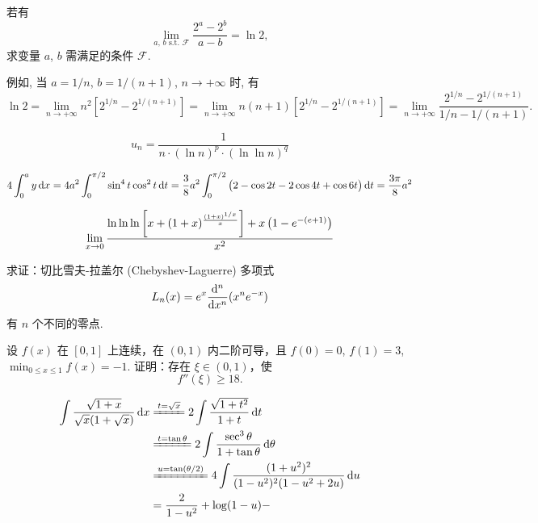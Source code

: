 \begin{exercise}
    若有 
    \[
    \lim_{a,\,b\text{ s.t. }\mathcal{F}}\frac{2^a-2^b}{a-b} = \ln 2,
    \]
    求变量 $a$, $b$ 需满足的条件 $\mathcal{F}$.
    
    例如, 当 $a=1/n$, $b=1/(n+1)$, $n\to +\infty$ 时, 有
    \[
    \ln 2
    = \lim_{n\to +\infty} n^2 [2^{1/n}-2^{1/(n+1)}]
    = \lim_{n\to +\infty} n(n+1) [2^{1/n}-2^{1/(n+1)}]
    = \lim_{n\to +\infty} \frac{2^{1/n}-2^{1/(n+1)}}{1/n - 1/(n+1)}.
    \]
\end{exercise}

\[
u_n = \frac{1}{n \cdot (\ln n)^p \cdot (\ln\ln n)^q}
\]

\[
4\int_0^a y \dx = 4a^2\int_0^{\pi/2} \sin^4 t \cos^2 t \dif t = \frac 38 a^2 \int_0^{\pi/2}\del[1]{2-\cos 2t - 2\cos 4t + \cos 6t}\dif t = \frac{3\pi}{8} a^2
\]

\[
\lim_{x \to 0} \frac{\ln \ln \ln \sbr[3]{x + (1 + x)^{\frac{(1 + x)^{1/x}}{x}}} + x \del[1]{1 - e^{-(e + 1)}}}{x^2}
\]


\begin{exercise}
    求证：切比雪夫-拉盖尔 (Chebyshev-Laguerre) 多项式
    \[
        L_n(x) = e^x \frac{\mathop{}\!\mathrm{d}^n}{\mathop{}\!\mathrm{d} x^n} (x^n e^{-x})
    \]
    有 $n$ 个不同的零点.
\end{exercise}





\begin{exercise}
    设 $f(x)$ 在 $[0, 1]$ 上连续，在 $(0, 1)$ 内二阶可导，且 $f(0) = 0$, $f(1) = 3$, $\min_{0 \le x \le 1} f(x) = -1$. 证明：存在 $\xi \in (0, 1)$，使
    \[
        f''(\xi) \ge 18.
    \]
\end{exercise}

\begin{align*}
    \int \frac{\sqrt{1 + x}}{\sqrt{x} (1 + \sqrt{x})} \dx
    &\xlongequal{t = \sqrt{x}} 2\int \frac{\sqrt{1 + t^2}}{1 + t} \dt \\
    &\xlongequal{t = \tan \theta} 2\int \frac{\sec^3 \theta}{1 + \tan \theta} \dif \theta \\
    &\xlongequal{u = \tan(\theta/2)} 4\int \frac{(1 + u^2)^2}{(1 - u^2)^2 (1 - u^2 + 2u)} \dif u \\
    &= \frac{2}{1 - u^2} + \log(1 - u) - 
\end{align*}

